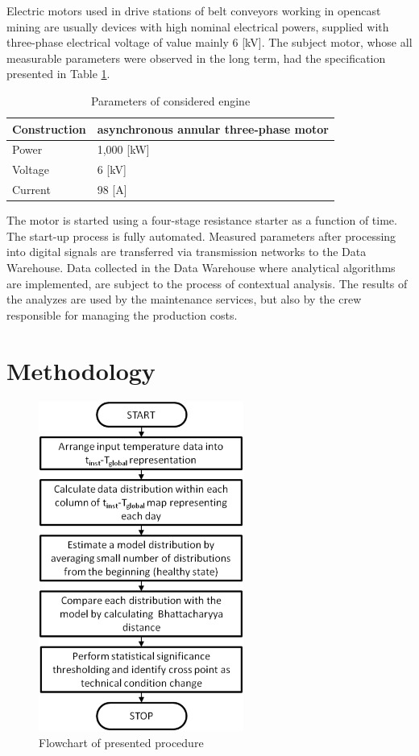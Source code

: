 \documentclass{svproc}
\begin{document}
Electric motors used in drive stations of belt conveyors working in opencast mining are usually devices with high nominal electrical powers, supplied with three-phase electrical voltage of value mainly 6 [kV]. The subject motor, whose all measurable parameters were observed in the long term, had the specification presented in Table \ref{tab:tab2}.

\begin{table}[ht!]
    \centering
    \caption{Parameters of considered engine}
    \begin{tabular}{|l|l|}
    \hline
         Construction & asynchronous annular three-phase motor  \\ \hline
         Power & 1,000 [kW] \\ \hline
         Voltage & 6 [kV] \\ \hline
         Current & 98 [A] \\
    \hline
    \end{tabular}
    \label{tab:tab2}
\end{table}

The motor is started using a four-stage resistance starter as a function of time. The start-up process is fully automated. Measured parameters after processing into digital signals are transferred via transmission networks to the Data Warehouse. Data collected in the Data Warehouse where analytical algorithms are implemented, are subject to the process of contextual analysis. The results of the analyzes are used by the maintenance services, but also by the crew responsible for managing the production costs. 


\section{Methodology}

\begin{figure}[ht!]
\centering
\includegraphics[width=0.6\textwidth]{figs/fig02.png}
\caption{Flowchart of presented procedure}
\label{fig:block}
\end{figure}
\end{document}
